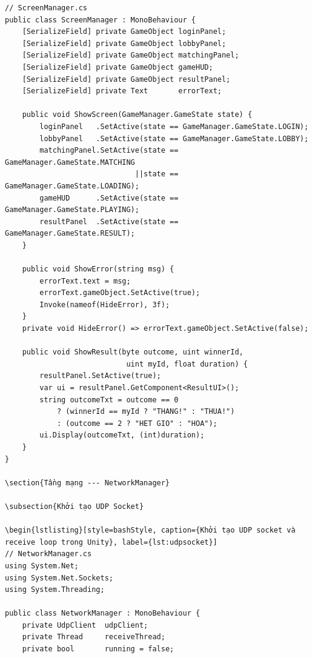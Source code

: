 \documentclass[12pt,a4paper]{report}
\begin{document}
\begin{lstlisting}[style=bashStyle, caption={ScreenManager --- ẩn/hiện Panel theo state}, label={lst:screenmgr}]
// ScreenManager.cs
public class ScreenManager : MonoBehaviour {
    [SerializeField] private GameObject loginPanel;
    [SerializeField] private GameObject lobbyPanel;
    [SerializeField] private GameObject matchingPanel;
    [SerializeField] private GameObject gameHUD;
    [SerializeField] private GameObject resultPanel;
    [SerializeField] private Text       errorText;

    public void ShowScreen(GameManager.GameState state) {
        loginPanel   .SetActive(state == GameManager.GameState.LOGIN);
        lobbyPanel   .SetActive(state == GameManager.GameState.LOBBY);
        matchingPanel.SetActive(state == GameManager.GameState.MATCHING
                              ||state == GameManager.GameState.LOADING);
        gameHUD      .SetActive(state == GameManager.GameState.PLAYING);
        resultPanel  .SetActive(state == GameManager.GameState.RESULT);
    }

    public void ShowError(string msg) {
        errorText.text = msg;
        errorText.gameObject.SetActive(true);
        Invoke(nameof(HideError), 3f);
    }
    private void HideError() => errorText.gameObject.SetActive(false);

    public void ShowResult(byte outcome, uint winnerId,
                            uint myId, float duration) {
        resultPanel.SetActive(true);
        var ui = resultPanel.GetComponent<ResultUI>();
        string outcomeTxt = outcome == 0
            ? (winnerId == myId ? "THANG!" : "THUA!")
            : (outcome == 2 ? "HET GIO" : "HOA");
        ui.Display(outcomeTxt, (int)duration);
    }
}

\section{Tầng mạng --- NetworkManager}

\subsection{Khởi tạo UDP Socket}

\begin{lstlisting}[style=bashStyle, caption={Khởi tạo UDP socket và receive loop trong Unity}, label={lst:udpsocket}]
// NetworkManager.cs
using System.Net;
using System.Net.Sockets;
using System.Threading;

public class NetworkManager : MonoBehaviour {
    private UdpClient  udpClient;
    private Thread     receiveThread;
    private bool       running = false;


\end{lstlisting}
\end{document}

